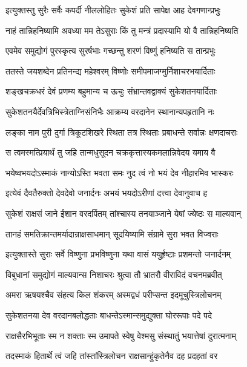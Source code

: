 \twolineshloka
{इत्युक्तस्तु सुरैः सर्वैः कपर्दी नीललोहितः}
{सुकेशं प्रति सापेक्ष आह देवगणान्प्रभुः} %

\twolineshloka
{नाहं तान्निहनिष्यामि अवध्या मम तेऽसुराः}
{किं तु मन्त्रं प्रदास्यामि यो वै तान्निहनिष्यति} %

\twolineshloka
{एवमेव समुद्योगं पुरस्कृत्य सुरर्षभाः}
{गच्छन्तु शरणं विष्णुं हनिष्यति स तान्प्रभुः} %

\twolineshloka
{ततस्ते जयशब्देन प्रतिनन्द्य महेश्वरम्}
{विष्णोः समीपमाजग्मुर्निशाचरभयार्दिताः} %

\twolineshloka
{शङ्खचक्रधरं देवं प्रणम्य बहुमान्य च}
{ऊचुः संभ्रान्तवद्वाक्यं सुकेशतनयार्दिताः} %

\twolineshloka
{सुकेशतनयैर्देवत्रिभिस्त्रेताग्निसंनिभैः}
{आक्रम्य वरदानेन स्थानान्यपहृतानि नः} %

\twolineshloka
{लङ्का नाम पुरी दुर्गा त्रिकूटशिखरे स्थिता}
{तत्र स्थिताः प्रबाधन्ते सर्वान्नः क्षणदाचराः} %

\twolineshloka
{स त्वमस्मत्प्रियार्थं तु जहि तान्मधुसूदन}
{चक्रकृत्तास्यकमलान्निवेदय यमाय वै} %

\twolineshloka
{भयेष्वभयदोऽस्माकं नान्योऽस्ति भवता समः}
{नुद त्वं नो भयं देव नीहारमिव भास्करः} %

\twolineshloka
{इत्येवं दैवतैरुक्तो देवदेवो जनार्दनः}
{अभयं भयदोऽरीणां दत्त्वा देवानुवाच ह} %

\twolineshloka
{सुकेशं राक्षसं जाने ईशान वरदर्पितम्}
{तांश्चास्य तनयाञ्जाने येषां ज्येष्ठः स माल्यवान्} %

\twolineshloka
{तानहं समतिक्रान्तमर्यादान्राक्षसाधमान्}
{सूदयिष्यामि संग्रामे सुरा भवत विज्वराः} %

\twolineshloka
{इत्युक्तास्ते सुराः सर्वे विष्णुना प्रभविष्णुना}
{यथा वासं ययुर्हृष्टाः प्रशमन्तो जनार्दनम्} %

\twolineshloka
{विबुधानां समुद्योगं माल्यवान्स निशाचरः}
{श्रुत्वा तौ भ्रातरौ वीराविदं वचनमब्रवीत्} %

\twolineshloka
{अमरा ऋषयश्चैव संहत्य किल शंकरम्}
{अस्मद्वधं परीप्सन्त इदमूचुस्त्रिलोचनम्} %

\twolineshloka
{सुकेशतनया देव वरदानबलोद्धताः}
{बाधन्तेऽस्मान्समुद्युक्ता घोररूपाः पदे पदे} %

\twolineshloka
{राक्षसैरभिभूताः स्म न शक्ताः स्म उमापते}
{स्वेषु वेश्मसु संस्थातुं भयात्तेषां दुरात्मनाम्} %

\twolineshloka
{तदस्माकं हितार्थे त्वं जहि तांस्तांस्त्रिलोचन}
{राक्षसान्हुंकृतेनैव दह प्रदहतां वर} %

